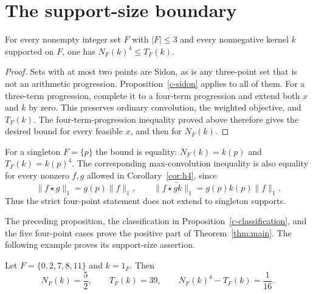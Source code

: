 \section{The support-size boundary}
\label{sec:boundary}

\begin{proposition}\label{b-small-support}
For every nonempty integer set $F$ with $|F|\le3$ and every nonnegative
kernel $k$ supported on $F$, one has $N_F(k)^4\le T_F(k)$.
\end{proposition}

\begin{proof}
Sets with at most two points are Sidon, as is any three-point set that is
not an arithmetic progression.  Proposition~\ref{c-sidon} applies to all
of them.  For a three-term progression, complete it to a four-term
progression and extend both $x$ and $k$ by zero.  This preserves ordinary
convolution, the weighted objective, and $T_F(k)$.  The four-term-progression
inequality proved above therefore gives the desired bound for every feasible
$x$, and then for $N_F(k)$.
\end{proof}

For a singleton $F=\{p\}$ the bound is equality:
$N_F(k)=k(p)$ and $T_F(k)=k(p)^4$.  The corresponding max-convolution
inequality is also equality for every nonzero $f,g$ allowed in
Corollary~\ref{cor:h4}, since
\[
 \|f\star g\|_1=g(p)\|f\|_1,\qquad
 \|f\star\widetilde{gk}\|_1=g(p)k(p)\|f\|_1.
\]
Thus the strict four-point statement does not extend to singleton supports.

The preceding proposition, the classification in
Proposition~\ref{c-classification}, and the five four-point cases prove
the positive part of Theorem~\ref{thm:main}.  The following example proves
its support-size assertion.

\begin{proposition}\label{b-five-point}
Let $F=\{0,2,7,8,11\}$ and $k=1_F$.  Then
\[
 N_F(k)=\frac52,\qquad T_F(k)=39,\qquad
 N_F(k)^4-T_F(k)=\frac1{16}.
\]
\end{proposition}

